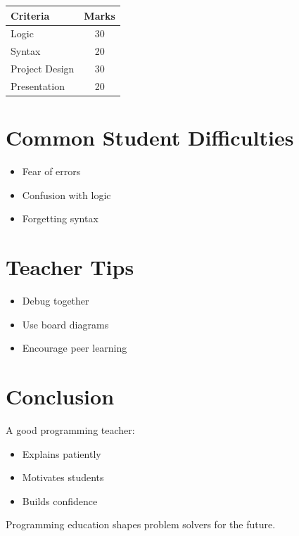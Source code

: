 \begin{center}
\begin{tabular}{|l|c|}
\hline
\textbf{Criteria} & \textbf{Marks} \\
\hline
Logic & 30 \\
Syntax & 20 \\
Project Design & 30 \\
Presentation & 20 \\
\hline
\end{tabular}
\end{center}

\section*{Common Student Difficulties}

\begin{itemize}
    \item Fear of errors
    \item Confusion with logic
    \item Forgetting syntax
\end{itemize}

\section*{Teacher Tips}

\begin{itemize}
    \item Debug together
    \item Use board diagrams
    \item Encourage peer learning
\end{itemize}

\section*{Conclusion}

A good programming teacher:
\begin{itemize}
    \item Explains patiently
    \item Motivates students
    \item Builds confidence
\end{itemize}

Programming education shapes problem solvers for the future.